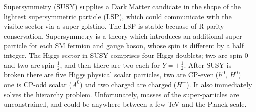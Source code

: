 %











Supersymmetry (SUSY)
supplies a Dark Matter candidate in the shape of the lightest supersymmetric
particle (LSP), which could communicate with the visible sector via a super-golstino.
The LSP is stable becuase of R-parity conservation.
Supersymmetry is a theory which introduces an additional super-particle for each SM fermion and
gauge boson, whose spin is different by a half integer.
The Higgs sector in SUSY comprises four Higgs doublets; two are spin-0 and two are spin-$\tfrac12$,
and then there are two each for $Y=\pm\tfrac12$.
After SUSY is broken there are five Higgs physical scalar particles, two are CP-even ($h^0$,
$H^0$) one is CP-odd scalar ($A^0$) and two charged are charged ($H^\pm$).
It also immediately solves the hierarchy problem.
Unfortunately, masses of the super-particles are unconstrained, and could be anywhere between a few
TeV and the Planck scale.

